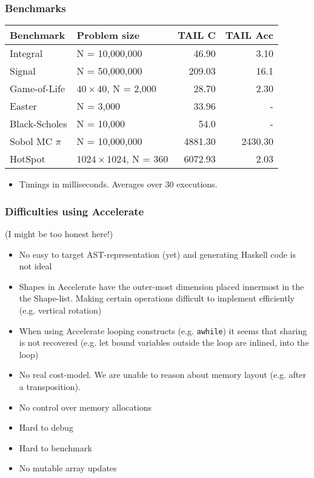 \documentclass{beamer}
\begin{document}
\begin{frame}
\frametitle{Benchmarks}

\begin{tabular}{llrr}
\textbf{Benchmark} & \textbf{Problem size} & \textbf{TAIL C} & \textbf{TAIL Acc} \\
\midrule
Integral       & N = 10,000,000 &  46.90 &    3.10 \\
Signal         & N = 50,000,000 & 209.03 &   16.1  \\
Game-of-Life   & $40\times 40$, N = 2,000 &  28.70 & 2.30 \\
Easter         & N = 3,000 &   33.96 &         -  \\
Black-Scholes  & N = 10,000&    54.0 &      -     \\
Sobol MC $\pi$ & N = 10,000,000  & 4881.30  &   2430.30   \\
HotSpot        & $1024\times 1024$, N = 360 &    6072.93 &   2.03
\end{tabular}

\vspace{1cm}

\begin{itemize}
\item Timings in milliseconds. Averages over 30 executions.
\end{itemize}

\end{frame}


\begin{frame}
\frametitle{Difficulties using Accelerate}

(I might be too honest here!)

\begin{itemize}
\item No easy to target AST-representation (yet) and generating
  Haskell code is not ideal
\item Shapes in Accelerate have the outer-most dimension placed
  innermost in the the Shape-list. Making certain operations difficult
  to implement efficiently (e.g. vertical rotation)
\item When using Accelerate looping constructs (e.g. \texttt{awhile})
  it seems that sharing is not recovered (e.g. let bound variables
  outside the loop are inlined, into the loop)
\item No real cost-model. We are unable to reason about memory layout
  (e.g. after a transposition).
\item No control over memory allocations
\item Hard to debug
\item Hard to benchmark%
\item No mutable array updates
\end{itemize}

\end{frame}
\end{document}
